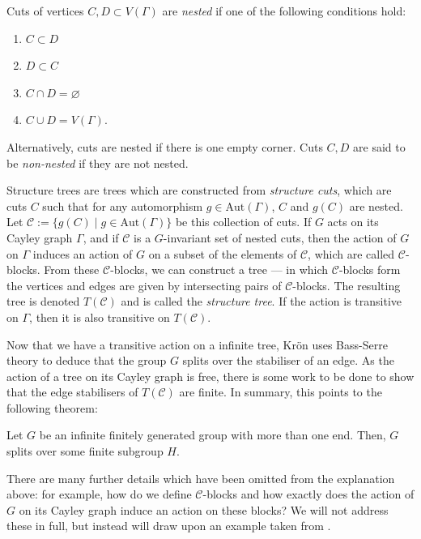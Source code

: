 \begin{definition}
    Cuts of vertices \(C, D \subset V(\Gamma)\) are \emph{nested} if one of the following conditions hold:
    \begin{enumerate}
        \item \(C \subset D\)
        \item \(D \subset C\)
        \item \(C \cap D = \varnothing\)
        \item \(C \cup D = V(\Gamma)\).
    \end{enumerate}
    Alternatively, cuts are nested if there is one empty corner. Cuts \(C,D\) are said to be \emph{non-nested} if they are not nested.
\end{definition}

Structure trees are trees which are constructed from \emph{structure cuts}, which are cuts \(C\) such that for any automorphism \(g \in \mathrm{Aut}(\Gamma)\), \(C\) and \(g(C)\) are nested. Let \(\mathcal{C} := \{g(C) \mid g \in \mathrm{Aut}(\Gamma)\}\) be this collection of cuts. If \(G\) acts on its Cayley graph \(\Gamma\), and if \(\mathcal{C}\) is a \(G\)-invariant set of nested cuts, then the action of \(G\) on \(\Gamma\) induces an action of \(G\) on a subset of the elements of \(\mathcal{C}\), which are called \(\mathcal{C}\)-blocks. From these \(\mathcal{C}\)-blocks, we can construct a tree --- in which \(\mathcal{C}\)-blocks form the vertices and edges are given by intersecting pairs of \(\mathcal{C}\)-blocks. The resulting tree is denoted \(T(\mathcal{C})\) and is called the \emph{structure tree}. If the action is transitive on \(\Gamma\), then it is also transitive on \(T(\mathcal{C})\).

Now that we have a transitive action on a infinite tree, Kr\"{o}n uses Bass-Serre theory to deduce that the group \(G\) splits over the stabiliser of an edge. As the action of a tree on its Cayley graph is free, there is some work to be done to show that the edge stabilisers of \(T(\mathcal{C})\) are finite.
In summary, this points to the following theorem:

\begin{theorem}
    Let \(G\) be an infinite finitely generated group with more than one end. Then, \(G\) splits over some finite subgroup \(H\). 
\end{theorem}

\begin{remark}
    There are many further details which have been omitted from the explanation above: for example, how do we define \(\mathcal{C}\)-blocks and how exactly does the action of \(G\) on its Cayley graph induce an action on these blocks? We will not address these in full, but instead will draw upon an example taken from \cite[p.~14]{D13}.
\end{remark}

